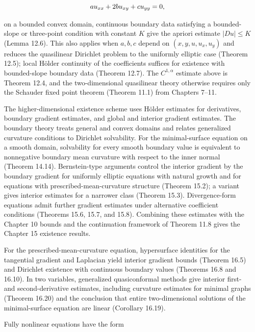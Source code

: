 \begin{equation}\label{gt.eq1.10}\dcref{(1.7)}\group{chapter-1}\source{gilbarg-trudinger:page-0019}
au_{xx}+2bu_{xy}+cu_{yy}=0,
\end{equation}

on a bounded convex domain, continuous boundary data satisfying a bounded-slope
or three-point condition with constant $K$ give the apriori estimate $|Du|\leq K$
(Lemma 12.6). This also applies when $a,b,c$ depend on
$(x,y,u,u_x,u_y)$ and reduces the quasilinear Dirichlet problem to the uniformly
elliptic case (Theorem 12.5); local H\"older continuity of the coefficients suffices
for existence with bounded-slope boundary data (Theorem 12.7). The
$C^{1,\alpha}$ estimate above is Theorem 12.4, and the two-dimensional
quasilinear theory otherwise requires only the Schauder fixed point theorem
(Theorem 11.1) from Chapters 7--11.

The higher-dimensional existence scheme uses H\"older estimates for derivatives,
boundary gradient estimates, and global and interior gradient estimates. The
boundary theory treats general and convex domains and relates generalized
curvature conditions to Dirichlet solvability. For the minimal-surface equation
on a smooth domain, solvability for every smooth boundary value is equivalent to
nonnegative boundary mean curvature with respect to the inner normal
(Theorem 14.14). Bernstein-type arguments control the interior gradient by the
boundary gradient for uniformly elliptic equations with natural growth and for
equations with prescribed-mean-curvature structure (Theorem 15.2); a variant
gives interior estimates for a narrower class (Theorem 15.3). Divergence-form
equations admit further gradient estimates under alternative coefficient
conditions (Theorems 15.6, 15.7, and 15.8). Combining these estimates with the
Chapter 10 bounds and the continuation framework of Theorem 11.8 gives the
Chapter 15 existence results.

For the prescribed-mean-curvature equation, hypersurface identities for the
tangential gradient and Laplacian yield interior gradient bounds (Theorem 16.5)
and Dirichlet existence with continuous boundary values (Theorems 16.8 and
16.10). In two variables, generalized quasiconformal methods give interior first-
and second-derivative estimates, including curvature estimates for minimal graphs
(Theorem 16.20) and the conclusion that entire two-dimensional solutions of the
minimal-surface equation are linear (Corollary 16.19).

Fully nonlinear equations have the form

